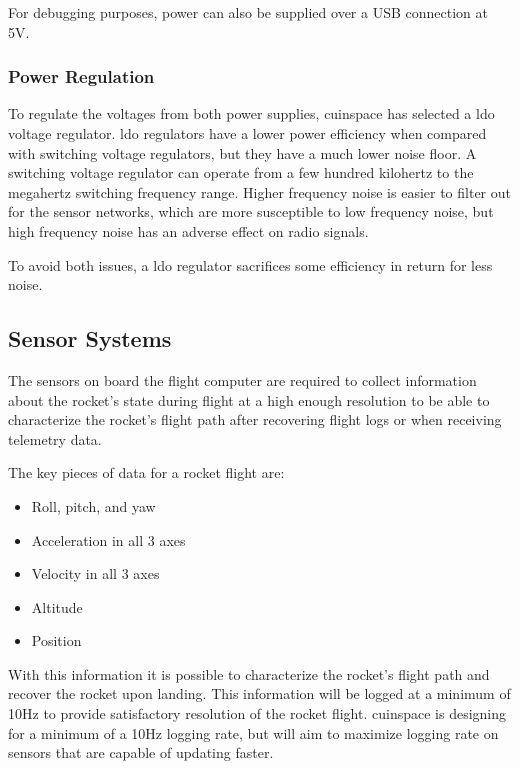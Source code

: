 For debugging purposes, power can also be supplied over a USB connection at 5V.

\subsubsection{Power Regulation}

To regulate the voltages from both power supplies, \gls{cuinspace} has selected a \gls{ldo} voltage regulator. \Gls{ldo} regulators have a lower power efficiency when compared with switching voltage regulators, but they have a much lower noise floor. A switching voltage regulator can operate from a few hundred kilohertz to the megahertz switching frequency range. Higher frequency noise is easier to filter out for the sensor networks, which are more susceptible to low frequency noise, but high frequency noise has an adverse effect on radio signals.

To avoid both issues, a \gls{ldo} regulator sacrifices some efficiency in return for less noise.

\subsection{Sensor Systems}

The sensors on board the flight computer are required to collect information about the rocket's state during flight at a high enough resolution to be able to characterize the rocket's flight path after recovering flight logs or when receiving telemetry data.

The key pieces of data for a rocket flight are:

\begin{itemize}
    \item Roll, pitch, and yaw
    \item Acceleration in all 3 axes
    \item Velocity in all 3 axes
    \item Altitude
    \item Position
\end{itemize}

With this information it is possible to characterize the rocket's flight path and recover the rocket upon landing. This information will be logged at a minimum of 10Hz to provide satisfactory resolution of the rocket flight. \gls{cuinspace} is designing for a minimum of a 10Hz logging rate, but will aim to maximize logging rate on sensors that are capable of updating faster.

